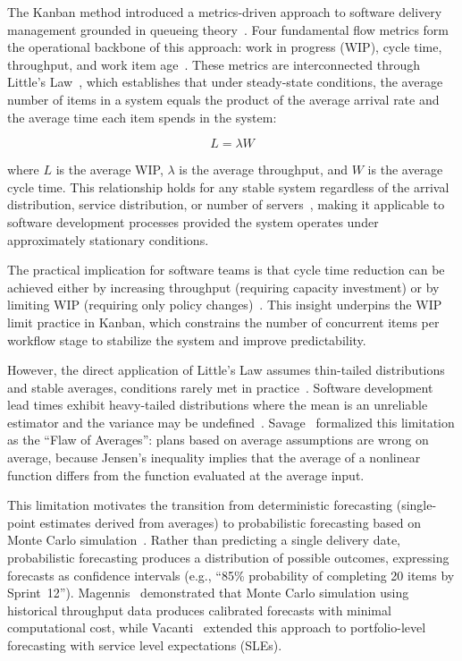 The Kanban method introduced a metrics-driven approach to software
delivery management grounded in queueing
theory~\cite{anderson2010kanban}. Four fundamental flow metrics form the
operational backbone of this approach: work in progress (WIP), cycle
time, throughput, and work item age~\cite{vacanti2015}. These metrics
are interconnected through Little's Law~\cite{little1961proof}, which
establishes that under steady-state conditions, the average number of
items in a system equals the product of the average arrival rate and the
average time each item spends in the system:

\begin{equation}
\label{eq:littles-law}
L = \lambda W
\end{equation}

\noindent where $L$ is the average WIP, $\lambda$ is the average
throughput, and $W$ is the average cycle time. This relationship holds
for any stable system regardless of the arrival distribution, service
distribution, or number of servers~\cite{little1961proof}, making it
applicable to software development processes provided the system
operates under approximately stationary conditions.

The practical implication for software teams is that cycle time
reduction can be achieved either by increasing throughput (requiring
capacity investment) or by limiting WIP (requiring only policy
changes)~\cite{anderson2010kanban, vacanti2015}. This insight
underpins the WIP limit practice in Kanban, which constrains the
number of concurrent items per workflow stage to stabilize the system
and improve predictability.

However, the direct application of Little's Law assumes thin-tailed
distributions and stable averages, conditions rarely met in
practice~\cite{savage2009flaw}. Software development lead times
exhibit heavy-tailed distributions where the mean is an unreliable
estimator and the variance may be
undefined~\cite{flyvbjerg2022empirical}. Savage~\cite{savage2009flaw}
formalized this limitation as the ``Flaw of Averages'': plans based on
average assumptions are wrong on average, because Jensen's inequality
implies that the average of a nonlinear function differs from the
function evaluated at the average input.

This limitation motivates the transition from deterministic forecasting
(single-point estimates derived from averages) to probabilistic
forecasting based on Monte Carlo
simulation~\cite{magennis2011forecasting, vacanti2020when}. Rather
than predicting a single delivery date, probabilistic forecasting
produces a distribution of possible outcomes, expressing forecasts as
confidence intervals (e.g., ``85\% probability of completing 20 items
by Sprint~12''). Magennis~\cite{magennis2011forecasting} demonstrated
that Monte Carlo simulation using historical throughput data produces
calibrated forecasts with minimal computational cost, while
Vacanti~\cite{vacanti2020when} extended this approach to portfolio-level
forecasting with service level expectations (SLEs).

